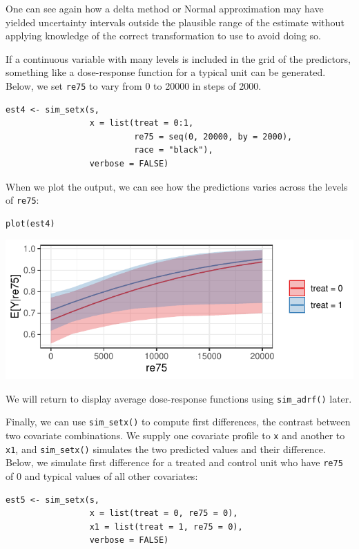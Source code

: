 One can see again how a delta method or Normal approximation may have yielded uncertainty intervals outside the plausible range of the estimate without applying knowledge of the correct transformation to use to avoid doing so.

If a continuous variable with many levels is included in the grid of the predictors, something like a dose-response function for a typical unit can be generated. Below, we set \texttt{re75} to vary from 0 to 20000 in steps of 2000.

\begin{verbatim}
est4 <- sim_setx(s,
                 x = list(treat = 0:1,
                          re75 = seq(0, 20000, by = 2000),
                          race = "black"),
                 verbose = FALSE)
\end{verbatim}

When we plot the output, we can see how the predictions varies across the levels of \texttt{re75}:

\begin{verbatim}
plot(est4)
\end{verbatim}

\begin{center}\includegraphics{figures/plot4-1} \end{center}

We will return to display average dose-response functions using \texttt{sim\_adrf()} later.

Finally, we can use \texttt{sim\_setx()} to compute first differences, the contrast between two covariate combinations. We supply one covariate profile to \texttt{x} and another to \texttt{x1}, and \texttt{sim\_setx()} simulates the two predicted values and their difference. Below, we simulate first difference for a treated and control unit who have \texttt{re75} of 0 and typical values of all other covariates:

\begin{verbatim}
est5 <- sim_setx(s,
                 x = list(treat = 0, re75 = 0),
                 x1 = list(treat = 1, re75 = 0),
                 verbose = FALSE)
\end{verbatim}

